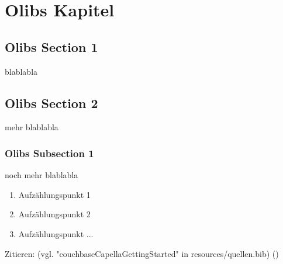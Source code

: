 \newpage
\chapter{Olibs Kapitel}


\section{Olibs Section 1}
blablabla


\section{Olibs Section 2}
mehr blablabla

\subsection{Olibs Subsection 1}
noch mehr blablabla


\begin{enumerate}
  \item Aufzählungspunkt 1
  \item Aufzählungspunkt 2
  \item Aufzählungspunkt ...
\end{enumerate}


Zitieren: (vgl. "couchbaseCapellaGettingStarted" in resources/quellen.bib)
(\cite{couchbaseCapellaGettingStarted})


